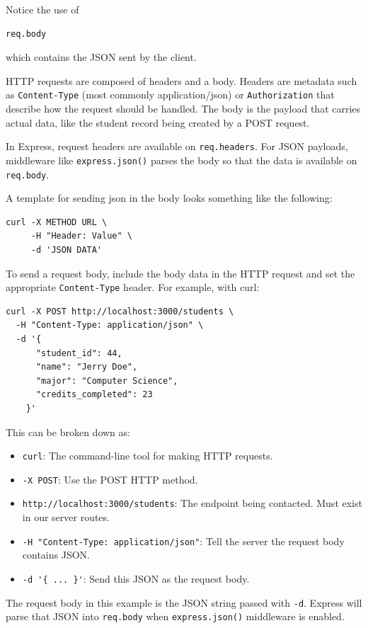 Notice the use of

\begin{verbatim}
req.body
\end{verbatim}

which contains the JSON sent by the client.

HTTP requests are composed of headers and a body. Headers are metadata such as \texttt{Content-Type} (most commonly application/json) or \texttt{Authorization} that describe how the request should be handled. The body is the payload that carries actual data, like the student record being created by a POST request.

In Express, request headers are available on \texttt{req.headers}. For JSON payloads, middleware like \texttt{express.json()} parses the body so that the data is available on \texttt{req.body}.

A template for sending json in the body looks something like the following:
\begin{verbatim}
curl -X METHOD URL \
     -H "Header: Value" \
     -d 'JSON DATA'
\end{verbatim}

To send a request body, include the body data in the HTTP request and set the appropriate \texttt{Content-Type} header. For example, with curl:

\begin{verbatim}
curl -X POST http://localhost:3000/students \
  -H "Content-Type: application/json" \
  -d '{
      "student_id": 44,
      "name": "Jerry Doe",
      "major": "Computer Science",
      "credits_completed": 23
    }'
\end{verbatim}
This can be broken down as:

\begin{itemize}
  \item \texttt{curl}: The command-line tool for making HTTP requests.
  \item \texttt{-X POST}: Use the POST HTTP method.
  \item \texttt{http://localhost:3000/students}: The endpoint being contacted. Must exist in our server routes.
  \item \texttt{-H "Content-Type: application/json"}: Tell the server the request body contains JSON.
  \item \verb|-d '{ ... }'|: Send this JSON as the request body.
\end{itemize}

The request body in this example is the JSON string passed with \texttt{-d}. Express will parse that JSON into \texttt{req.body} when \texttt{express.json()} middleware is enabled.

